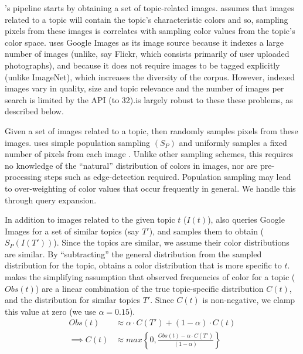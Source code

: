 \system's pipeline starts by obtaining a set of topic-related images. \system assumes that images related to a topic will contain the topic's characteristic colors and so, sampling pixels from these images is correlates with sampling color values from the topic's color space. \system uses Google Images as its image source because it indexes a large number of images  (unlike, say Flickr, which consists primarily of user uploaded photographs), and because it does not require images to be tagged explicitly (unlike ImageNet), which increases the diversity of the corpus. However, indexed images vary in quality, size and topic relevance and the number of images per search is limited by the API (to 32).\system is largely robust to these these problems, as described below. 

Given a set of images related to a topic, \system then randomly samples pixels from these images. \system uses simple population sampling $(S_{P})$ and uniformly samples a fixed number of pixels from each image . Unlike other sampling schemes, this requires no knowledge of the ``natural'' distribution of colors in images, nor are pre-processing steps such as edge-detection required. Population sampling may lead to over-weighting of color values that occur frequently in general. We handle this through query expansion.

In addition to images related to the given topic $t$ ($I(t)$), \system also queries Google Images for a set of similar topics (say $T'$), and samples them to obtain ($S_{P}(I(T'))$). Since the topics are similar, we assume their color distributions are similar. By ``subtracting'' the general distribution from the sampled distribution for the topic, \system obtains a color distribution that is more specific to $t$. \system makes the simplifying assumption that observed frequencies of color for a topic ($Obs(t)$) are a linear combination of the true topic-specific distribution $C(t)$, and the distribution for similar topics $T'$. Since $C(t)$ is non-negative, we clamp this value at zero (we use $\alpha = 0.15$).
\begin{align}
Obs(t) &\approx \alpha\cdot C(T') + (1-\alpha)\cdot C(t) \\
\label{linear-color}
\implies  C(t) &\approx max\left\{0,\frac{Obs(t) - \alpha\cdot C(T')}{(1-\alpha)}\right\}
\end{align}

